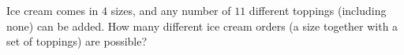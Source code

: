 Ice cream comes in $4$ sizes, and any number of $11$ different toppings (including none) can be added. How many different ice cream orders (a size together with a set of toppings) are possible?

